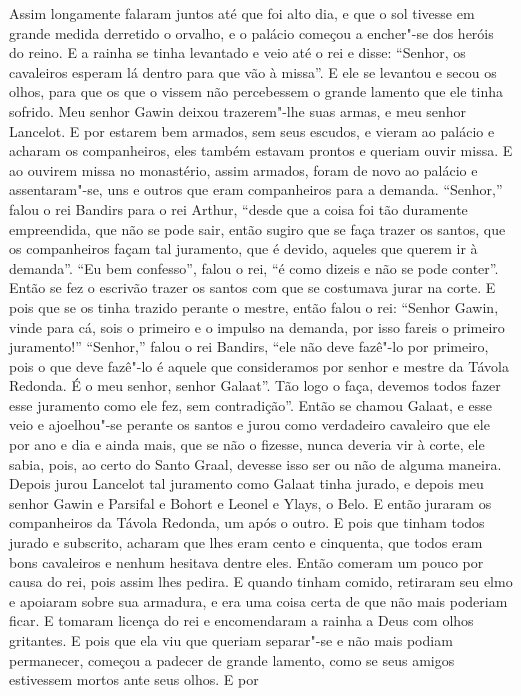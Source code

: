 Assim longamente falaram juntos até que foi alto dia, e que o sol tivesse em
grande medida derretido o orvalho, e o palácio começou a encher"-se dos heróis
do reino. E a rainha se tinha levantado e veio até o rei e disse: “Senhor, os
cavaleiros esperam lá dentro para que vão à missa”. E ele se levantou e secou
os olhos, para que os que o vissem não percebessem o grande lamento que ele
tinha sofrido. Meu senhor Gawin deixou trazerem"-lhe suas armas, e meu senhor
Lancelot. E por estarem bem armados, sem seus escudos, e vieram ao
palácio e acharam os companheiros, eles também estavam prontos e queriam ouvir
missa. E ao ouvirem missa no monastério, assim armados, foram de novo ao
palácio e assentaram"-se, uns e outros que eram companheiros para a demanda.
“Senhor,” falou o rei Bandirs para o rei Arthur, “desde que a coisa foi tão
duramente empreendida, que não se pode sair, então sugiro que se faça trazer os
santos, que os companheiros façam tal juramento, que é devido, aqueles que
querem ir à demanda”. “Eu bem confesso”, falou o rei, “é como dizeis e não se
pode conter”. Então se fez o escrivão trazer os santos com que se costumava
jurar na corte. E pois que se os tinha trazido perante o mestre, então falou o
rei: “Senhor Gawin, vinde para cá, sois o primeiro e o impulso na demanda, por
isso fareis o primeiro juramento!” “Senhor,” falou o rei Bandirs, “ele não
deve fazê"-lo por primeiro, pois o que deve fazê"-lo é aquele que consideramos
por senhor e mestre da Távola Redonda. É o meu senhor, senhor Galaat”. Tão logo
o faça, devemos todos fazer esse juramento como ele fez, sem contradição”.
Então se chamou Galaat, e esse veio e ajoelhou"-se perante os santos e jurou
como verdadeiro cavaleiro que ele por ano e dia e ainda mais, que se não o
fizesse, nunca deveria vir à corte, ele sabia, pois, ao certo do Santo Graal,
devesse isso ser ou não de alguma maneira. Depois jurou Lancelot tal
juramento como Galaat tinha jurado, e depois meu senhor Gawin e Parsifal e
Bohort e Leonel e Ylays, o Belo. E então juraram os companheiros da
Távola Redonda, um após o outro. E pois que tinham todos jurado e subscrito,
acharam que lhes eram cento e cinquenta, que todos eram bons cavaleiros e
nenhum hesitava dentre eles. Então comeram um pouco por causa do rei, pois
assim lhes pedira. E quando tinham comido, retiraram seu elmo e apoiaram sobre
sua armadura, e era uma coisa certa de que não mais poderiam ficar. E tomaram
licença do rei e encomendaram a rainha a Deus com olhos gritantes. E pois que
ela viu que queriam separar"-se e não mais podiam permanecer, começou a padecer
de grande lamento, como se seus amigos estivessem mortos ante seus olhos. E por
